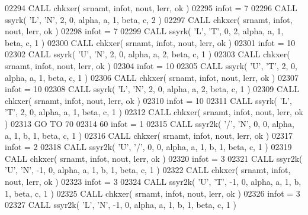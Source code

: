 \begin{DoxyCode}
02294       \textcolor{keyword}{CALL }chkxer( srnamt, infot, nout, lerr, ok )
02295       infot = 7
02296       \textcolor{keyword}{CALL }ssyrk( \textcolor{stringliteral}{'L'}, \textcolor{stringliteral}{'N'}, 2, 0, alpha, a, 1, beta, c, 2 )
02297       \textcolor{keyword}{CALL }chkxer( srnamt, infot, nout, lerr, ok )
02298       infot = 7
02299       \textcolor{keyword}{CALL }ssyrk( \textcolor{stringliteral}{'L'}, \textcolor{stringliteral}{'T'}, 0, 2, alpha, a, 1, beta, c, 1 )
02300       \textcolor{keyword}{CALL }chkxer( srnamt, infot, nout, lerr, ok )
02301       infot = 10
02302       \textcolor{keyword}{CALL }ssyrk( \textcolor{stringliteral}{'U'}, \textcolor{stringliteral}{'N'}, 2, 0, alpha, a, 2, beta, c, 1 )
02303       \textcolor{keyword}{CALL }chkxer( srnamt, infot, nout, lerr, ok )
02304       infot = 10
02305       \textcolor{keyword}{CALL }ssyrk( \textcolor{stringliteral}{'U'}, \textcolor{stringliteral}{'T'}, 2, 0, alpha, a, 1, beta, c, 1 )
02306       \textcolor{keyword}{CALL }chkxer( srnamt, infot, nout, lerr, ok )
02307       infot = 10
02308       \textcolor{keyword}{CALL }ssyrk( \textcolor{stringliteral}{'L'}, \textcolor{stringliteral}{'N'}, 2, 0, alpha, a, 2, beta, c, 1 )
02309       \textcolor{keyword}{CALL }chkxer( srnamt, infot, nout, lerr, ok )
02310       infot = 10
02311       \textcolor{keyword}{CALL }ssyrk( \textcolor{stringliteral}{'L'}, \textcolor{stringliteral}{'T'}, 2, 0, alpha, a, 1, beta, c, 1 )
02312       \textcolor{keyword}{CALL }chkxer( srnamt, infot, nout, lerr, ok )
02313       \textcolor{keywordflow}{GO TO} 70
02314    60 infot = 1
02315       \textcolor{keyword}{CALL }ssyr2k( \textcolor{stringliteral}{'/'}, \textcolor{stringliteral}{'N'}, 0, 0, alpha, a, 1, b, 1, beta, c, 1 )
02316       \textcolor{keyword}{CALL }chkxer( srnamt, infot, nout, lerr, ok )
02317       infot = 2
02318       \textcolor{keyword}{CALL }ssyr2k( \textcolor{stringliteral}{'U'}, \textcolor{stringliteral}{'/'}, 0, 0, alpha, a, 1, b, 1, beta, c, 1 )
02319       \textcolor{keyword}{CALL }chkxer( srnamt, infot, nout, lerr, ok )
02320       infot = 3
02321       \textcolor{keyword}{CALL }ssyr2k( \textcolor{stringliteral}{'U'}, \textcolor{stringliteral}{'N'}, -1, 0, alpha, a, 1, b, 1, beta, c, 1 )
02322       \textcolor{keyword}{CALL }chkxer( srnamt, infot, nout, lerr, ok )
02323       infot = 3
02324       \textcolor{keyword}{CALL }ssyr2k( \textcolor{stringliteral}{'U'}, \textcolor{stringliteral}{'T'}, -1, 0, alpha, a, 1, b, 1, beta, c, 1 )
02325       \textcolor{keyword}{CALL }chkxer( srnamt, infot, nout, lerr, ok )
02326       infot = 3
02327       \textcolor{keyword}{CALL }ssyr2k( \textcolor{stringliteral}{'L'}, \textcolor{stringliteral}{'N'}, -1, 0, alpha, a, 1, b, 1, beta, c, 1 )

\end{DoxyCode}
